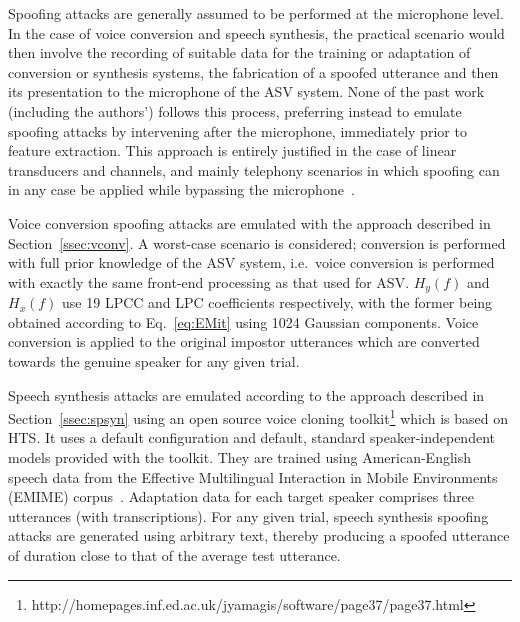 
Spoofing attacks are generally assumed to be performed at the microphone level.
In the case of voice conversion and speech synthesis, the practical scenario would then involve the recording of suitable data for the training or adaptation of conversion or synthesis systems, the fabrication of a spoofed utterance and then its presentation to the microphone of the ASV system.
None of the past work (including the authors') follows this process, preferring instead to emulate spoofing attacks by intervening after the microphone, immediately prior to feature extraction.
This approach is entirely justified in the case of linear transducers and channels, and mainly telephony scenarios in which spoofing can in any case be applied while bypassing the microphone~\cite{handbookChapter}.

Voice conversion spoofing attacks are emulated with the approach described in Section~\ref{ssec:vconv}. 
A worst-case scenario is considered; conversion is performed with full prior knowledge of the ASV system, i.e.\ voice conversion is performed with exactly the same front-end processing as that used for ASV.
$H_y(f)$ and $H_x(f)$ use 19 LPCC and LPC coefficients respectively, with the former being obtained according to Eq.~\ref{eq:EMit} using 1024 Gaussian components.
Voice conversion is applied to the original impostor utterances which are converted towards the genuine speaker for any given trial.

Speech synthesis attacks are emulated according to the approach described in Section~\ref{ssec:spsyn} using an open source voice cloning toolkit\footnote{http://homepages.inf.ed.ac.uk/jyamagis/software/page37/page37.html} which is based on HTS.  It uses  a default configuration and default, standard speaker-independent models provided with the toolkit.  They are trained using American-English speech data from the Effective Multilingual Interaction in Mobile Environments (EMIME) corpus~\cite{Wester2010}.   
Adaptation data for each target speaker comprises three utterances (with transcriptions).  
For any given trial, speech synthesis spoofing attacks are generated using arbitrary text, thereby producing a spoofed utterance of duration close to that of the average test utterance.
